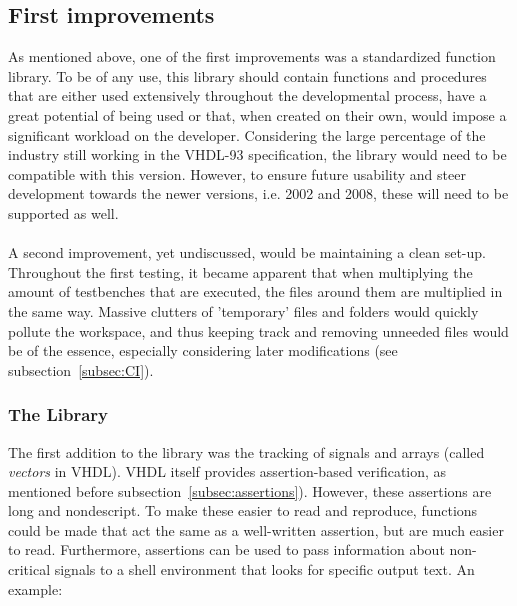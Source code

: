 \documentclass[11pt,british]{article}
\begin{document}
\newpage{}
\subsection{First improvements}
As mentioned above, one of the first improvements was a standardized function library. To be of any use, this library should contain functions and procedures that are either used extensively throughout the developmental process, have a great potential of being used or that, when created on their own, would impose a significant workload on the developer. Considering the large percentage of the industry still working in the VHDL-93 specification, the library would need to be compatible with this version. However, to ensure future usability and steer development towards the newer versions, i.e. 2002 and 2008, these will need to be supported as well.\\
\\
A second improvement, yet undiscussed, would be maintaining a clean set-up. Throughout the first testing, it became apparent that when multiplying the amount of testbenches that are executed, the files around them are multiplied in the same way. Massive clutters of 'temporary' files and folders would quickly pollute the workspace, and thus keeping track and removing unneeded files would be of the essence, especially considering later modifications (see subsection~\ref{subsec:CI}).

\subsubsection{The Library}
The first addition to the library was the tracking of signals and arrays (called \emph{vectors} in VHDL). VHDL itself provides assertion-based verification, as mentioned before subsection~\ref{subsec:assertions}). However, these assertions are long and nondescript. To make these easier to read and reproduce, functions could be made that act the same as a well-written assertion, but are much easier to read. Furthermore, assertions can be used to pass information about non-critical signals to a shell environment that looks for specific output text. An example:
\end{document}
